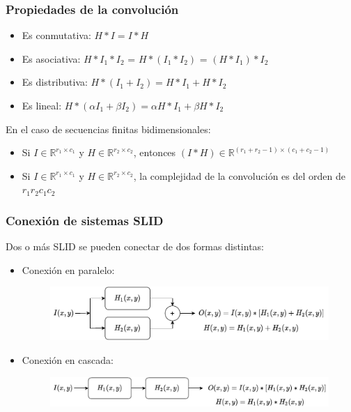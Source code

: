 \begin{frame}\frametitle{Propiedades de la convolución}
  \begin{itemize}
  \item Es conmutativa: $H*I = I*H$
  \item Es asociativa: $H*I_1*I_2$ = $H*(I_1*I_2)$ = $(H*I_1)*I_2$
  \item Es distributiva: $H*(I_1 + I_2) = H*I_1 + H*I_2$
  \item Es lineal: $H*(\alpha I_1 + \beta I_2) = \alpha H*I_1 + \beta H*I_2$
  \end{itemize}
  En el caso de secuencias finitas bidimensionales:
  \begin{itemize}
  \item Si $I\in\mathbb{R}^{r_1\times c_1}$ y $H\in\mathbb{R}^{r_2\times c_2}$, entonces $(I*H) \in \mathbb{R}^{(r_1+r_2-1)\times (c_1 + c_2 - 1)}$
  \item Si $I\in\mathbb{R}^{r_1\times c_1}$ y $H\in\mathbb{R}^{r_2\times c_2}$, la complejidad de la convolución es del orden de $r_1 r_2 c_1 c_2$
  \end{itemize}
\end{frame}

\begin{frame}\frametitle{Conexión de sistemas SLID}
  Dos o más SLID se pueden conectar de dos formas distintas:
  \begin{itemize}
  \item Conexión en paralelo:
    \begin{figure}
      \centering
      \includegraphics[scale=0.7]{Figures/SLIDParallel.pdf}
    \end{figure}
  \item Conexión en cascada:
    \begin{figure}
      \centering
      \includegraphics[scale=0.7]{Figures/SLIDCascade.pdf}
    \end{figure}
  \end{itemize}
\end{frame}

